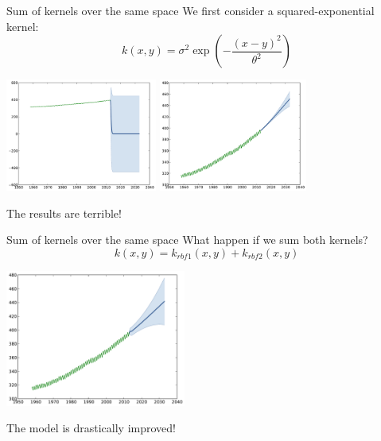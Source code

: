 \documentclass{beamer}
\begin{document}
\begin{frame}{Sum of kernels over the same space }
We first consider a squared-exponential kernel: 
$$ \displaystyle k(x,y) = \sigma^2\exp \left(-\frac{(x-y)^2}{\theta^2} \right)$$
\begin{center}
\includegraphics[height=3.7cm]{figures/python/CO2-rbfa} \quad \includegraphics[height=3.7cm]{figures/python/CO2-rbfb}
\end{center}
\begin{block}{}
\centering
\alert{The results are terrible!}
\end{block}
\end{frame}

\begin{frame}{Sum of kernels over the same space }
What happen if we sum both kernels?
\begin{equation*}
k(x,y) = k_{rbf1}(x,y) + k_{rbf2}(x,y)
\end{equation*} 
\pause
\begin{center}
\vspace{-8mm} \includegraphics[height=4.5cm]{figures/python/CO2-rbfab}
\end{center}
\begin{block}{}
\centering
\alert{The model is drastically improved!}
\end{block}
\end{frame}
\end{document}
